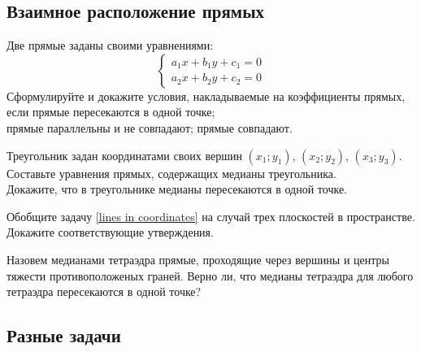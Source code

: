 \subsection*{Взаимное расположение прямых}

\begin{problems}

\item \label{lines in coordinates}
Две прямые заданы своими уравнениями:
\[\left\{\begin{aligned}
    a_1 x + b_1 y + c_1 = 0\\
    a_2 x + b_2 y + c_2 = 0
\end{aligned}\right.\]
Сформулируйте и докажите условия, накладываемые на коэффициенты прямых, если
\quad
\sbp прямые пересекаются в одной точке;
\\
\sbp прямые параллельны и не совпадают;
\quad
\sbp прямые совпадают.

\item
Треугольник задан координатами своих вершин
$(x_1; y_1)$, $(x_2; y_2)$, $(x_3; y_3)$.
\\
\sbp Составьте уравнения прямых, содержащих медианы треугольника.
\\
\sbp Докажите, что в треугольнике медианы пересекаются в одной точке.

\item
Обобщите задачу \ref{lines in coordinates} на случай трех плоскостей в
пространстве.
Докажите соответствующие утверждения.

\item
Назовем медианами тетраэдра прямые, проходящие через вершины и центры тяжести
противоположеных граней.
Верно ли, что медианы тетраэдра для любого тетраэдра пересекаются в одной
точке?

\end{problems}

\subsection*{Разные задачи}

